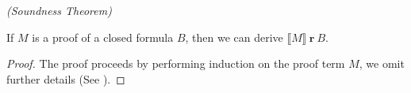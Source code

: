 \begin{mytheorem}
\emph{(Soundness Theorem)}

If $M$ is a proof of a closed formula $B$, then we can derive  $ \llbracket M \rrbracket \ \textbf{r} \ B$.

\begin{proof}

The proof proceeds by performing induction on the proof term $M$, we omit further details (See \cite{HS14}).

\begin{comment}
\begin{description}

\item[Case] $\lambda u^A M^B$ We must derive $$\llbracket \lambda u^A M^B
  \rrbracket \textbf{r} B$$
   \begin{description}
     \item[Subcase] $\tau(A) = \epsilon$ In this case the empty term realises
       A, making the $\lambda u $ redundant, which implies that the extracted
       program from M realises B $$\llbracket \lambda u M \rrbracket
       \textbf{r} (A \to B) = \epsilon \textbf{r} A \to \llbracket M
       \rrbracket \textbf{r} B$$
     \item[Subcase] $\tau(A) \neq \epsilon = \tau (B)$ In this case the
       extracted program is empty $ \llbracket \lambda u M \rrbracket = \epsilon$.

       $$\llbracket \lambda u M \rrbracket \textbf{r} (A \to B) = \forall
       x. x \textbf{r} A \to \epsilon \textbf{r} B$$
     \item[Subcase]$\tau (A) \neq \epsilon \neq \tau (B)$ neither the type of $A$ or $B$ is empty. Therefore if we have an $x$ that
       realises $A$ then this $x$ applied to the extracted program realises B.
         

   \end{description}

\item[Case] $\exists^+_{x,A}$ We now consider the case that an existential
  introduction axiom had been applied in the proof. The axiom takes the
  following form $$\exists^+_{x,A}: \forall^{nc} \vec{\rho} \forall x. A \to
  \exists x A $$
  For our proof of the soundness theorem we need to find a derivation
  of $$\llbracket \exists^+_{x,A} \rrbracket \textbf{r} \forall^{nc}
  \vec{\rho} \forall x.A \to \exists x A$$

  \begin{description}
   

\end{comment}
\end{proof}
\end{mytheorem}
